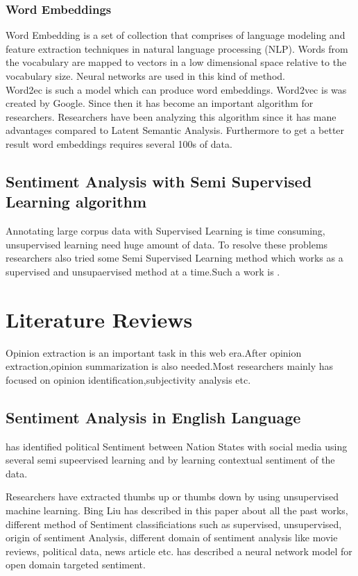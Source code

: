 \documentclass[a4paper,12pt]{report}
\begin{document}
\subsection{Word Embeddings}
Word Embedding is a set of collection that comprises of language modeling and feature extraction techniques in natural language processing (NLP). Words from the vocabulary are mapped to vectors in a low dimensional space relative to the vocabulary size. Neural networks are used in this kind of method. \citep{wikipidea}
\\
Word2ec is such a model which can produce word embeddings. Word2vec is was created by Google. Since then it has become an important algorithm for researchers. Researchers have been analyzing this algorithm since it has mane advantages compared to Latent Semantic Analysis. Furthermore to get a better result word embeddings requires several 100s of data.
\section{Sentiment Analysis with Semi Supervised Learning algorithm}
Annotating large corpus data with Supervised Learning is time consuming, unsupervised learning need huge amount of data. To resolve these problems researchers also tried some Semi Supervised Learning method which works as a supervised and unsupaervised method at a time.Such a work is \citep{li2010employing}.

\chapter{Literature Reviews}

Opinion extraction is an important task in this web era.After opinion extraction,opinion summarization is also needed.Most researchers mainly has focused on opinion identification,subjectivity analysis etc.
\section{Sentiment Analysis in English Language}
\citep{chambers2015identifying} has identified political Sentiment between Nation States with social media using several semi supeervised learning and by learning contextual sentiment of the data.

Researchers have extracted thumbs up or thumbs down by using unsupervised machine learning.
\citep{turney2002thumbs}
\citep{liu2012sentiment}
Bing Liu has described in this paper about all the past works, different method of Sentiment classificiations such as supervised, unsupervised, origin of sentiment Analysis, different domain of sentiment analysis like movie reviews, political data, news article etc.
\citep{zhang2015neural} has described a neural network model for open domain targeted sentiment.
\end{document}
